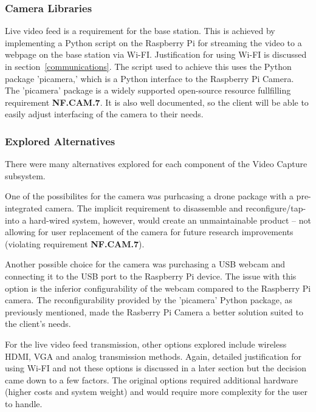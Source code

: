 \subsubsection{Camera Libraries}
Live video feed is a requirement for the base station. This is achieved by implementing a Python script on the Raspberry Pi for streaming the video to a webpage on the base station via Wi-FI. Justification for using Wi-FI is discussed in section~\ref{communications}. The script used to achieve this uses the Python package 'picamera,' which is a Python interface to the Raspberry Pi Camera. The 'picamera' package is a widely supported open-source resource fullfilling requirement \textbf{NF.CAM.7}. It is also well documented, so the client will be able to easily adjust interfacing of the camera to their needs.

\subsubsection{Explored Alternatives}
There were many alternatives explored for each component of the Video Capture subsystem.

One of the possibilites for the camera was purhcasing a drone package with a pre-integrated camera. The implicit requirement to disassemble and reconfigure/tap-into a hard-wired system, however, would create an unmaintainable product -- not allowing for user replacement of the camera for future research improvements (violating requirement \textbf{NF.CAM.7}). %

Another possible choice for the camera was purchasing a USB webcam and connecting it to the USB port to the Raspberry Pi device. The issue with this option is the inferior configurability of the webcam compared to the Raspberry Pi camera. The reconfigurability provided by the 'picamera' Python package, as previously mentioned, made the Rasberry Pi Camera a better solution suited to the client's needs.

For the live video feed transmission, other options explored include wireless HDMI, VGA and analog transmission methods. Again, detailed justification for using Wi-FI and not these options is discussed in a later section but the decision came down to a few factors. The original options required additional hardware (higher costs and system weight) and would require more complexity for the user to handle.
